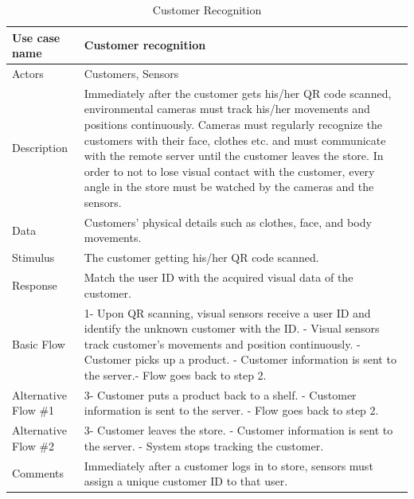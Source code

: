 \documentclass[11pt]{article}
\begin{document}
    \begin{table}[H]
        \begin{centering}
        \begin{tabular}{|p{2.5cm}|p{12cm}|}
        \hline
        Use case name & Customer recognition \\ \hline
        Actors        & Customers, Sensors \\ \hline
        Description   & Immediately after the customer gets his/her QR code scanned, environmental cameras must track his/her movements and positions continuously. Cameras must regularly recognize the customers with their face, clothes etc. and must communicate with the remote server until the customer leaves the store. In order to not to lose visual contact with the customer, every angle in the store must be watched by the cameras and the sensors. \\ \hline
        Data          & Customers' physical details such as clothes, face, and body movements.  \\ \hline
        Stimulus      & The customer getting his/her QR code scanned. \\ \hline
        Response      & Match the user ID with the acquired visual data of the customer. \\ \hline
        Basic Flow    & 
        1- Upon QR scanning, visual sensors receive a user ID and identify the unknown customer with the ID. \newline
        2- Visual sensors track customer's movements and position continuously. \newline
        3- Customer picks up a product. \newline
        4- Customer information is sent to the server.\newline
        5- Flow goes back to step 2. \\ \hline
        Alternative
            Flow \#1  & 
        3- Customer puts a product back to a shelf. \newline
        4- Customer information is sent to the server. \newline
        5- Flow goes back to step 2. \\ \hline
        Alternative
            Flow \#2  &
        3- Customer leaves the store. \newline
        4- Customer information is sent to the server. \newline
        5- System stops tracking the customer. \\ \hline
        Comments      & Immediately after a customer logs in to store, sensors must assign a unique customer ID to that user. \\ \hline
        
        \end{tabular}
        \caption{Customer Recognition}
        \label{tab3}
        \end{centering}
        \end{table}    
        
\end{document}
